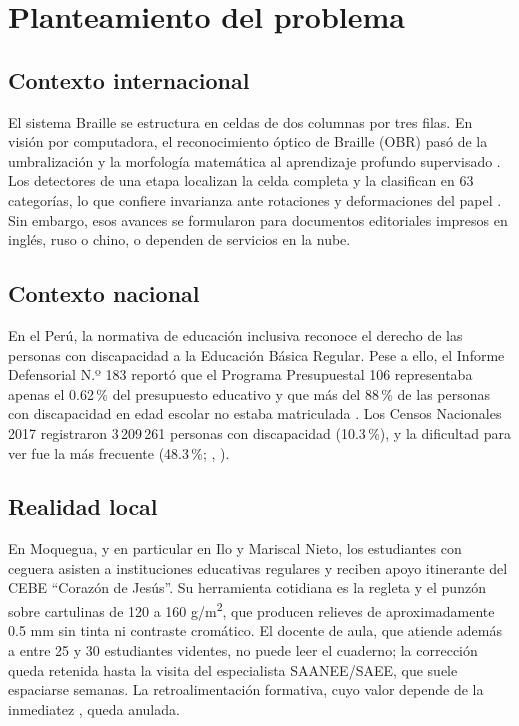 \section{Planteamiento del problema}

\subsection{Contexto internacional}
El sistema Braille se estructura en celdas de dos columnas por tres filas. En
visión por computadora, el reconocimiento óptico de Braille (OBR) pasó de la
umbralización y la morfología matemática \parencite{antonacopoulos2004} al
aprendizaje profundo supervisado \parencite{li2020}. Los detectores de una etapa
localizan la celda completa y la clasifican en 63 categorías, lo que confiere
invarianza ante rotaciones y deformaciones del papel
\parencite{ovodov2021,sun2025}. Sin embargo, esos avances se formularon para
documentos editoriales impresos en inglés, ruso o chino, o dependen de servicios
en la nube.

\subsection{Contexto nacional}
En el Perú, la normativa de educación inclusiva reconoce el derecho de las
personas con discapacidad a la Educación Básica Regular. Pese a ello, el Informe
Defensorial N.º 183 reportó que el Programa Presupuestal 106 representaba apenas
el 0.62\,\% del presupuesto educativo y que más del 88\,\% de las personas con
discapacidad en edad escolar no estaba matriculada \parencite{defensoria2019}.
Los Censos Nacionales 2017 registraron 3\,209\,261 personas con discapacidad
(10.3\,\%), y la dificultad para ver fue la más frecuente (48.3\,\%;
\citeauthor{inei2018}, \citeyear{inei2018}).

\subsection{Realidad local}
En Moquegua, y en particular en Ilo y Mariscal Nieto, los estudiantes con ceguera
asisten a instituciones educativas regulares y reciben apoyo itinerante del CEBE
``Corazón de Jesús''. Su herramienta cotidiana es la regleta y el punzón sobre
cartulinas de 120 a 160 g/m\textsuperscript{2}, que producen relieves de
aproximadamente 0.5 mm sin tinta ni contraste cromático. El docente de aula, que
atiende además a entre 25 y 30 estudiantes videntes, no puede leer el cuaderno;
la corrección queda retenida hasta la visita del especialista SAANEE/SAEE, que
suele espaciarse semanas. La retroalimentación formativa, cuyo valor depende de
la inmediatez \parencite{hattie2007}, queda anulada.

